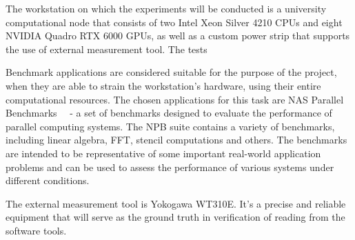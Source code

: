 The workstation on which the experiments will be conducted is
a university computational node that consists of two Intel Xeon
Silver 4210 CPUs and eight NVIDIA Quadro RTX 6000 GPUs, as well
as a custom power strip that supports the use of external
measurement tool. The tests

Benchmark applications are considered suitable for the purpose
of the project, when they are able to strain the workstation's
hardware, using their entire computational resources. The chosen
applications for this task are NAS Parallel
Benchmarks~\cite{NPB}~\cite{NASA_Advanced_Supercomputing} - a set
of benchmarks designed to evaluate the performance of parallel
computing systems. The NPB suite contains a variety of
benchmarks, including linear algebra, FFT, stencil computations
and others. The benchmarks are intended to be representative of
some important real-world application problems and can be used
to assess the performance of various systems under different
conditions.

The external measurement tool is Yokogawa WT310E. It's a precise
and reliable equipment that will serve as the ground truth in
verification of reading from the software tools.
